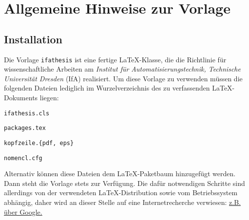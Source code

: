 
\chapter{Allgemeine Hinweise zur Vorlage}
\label{sec:AllgemeineHinweiseZurVorlage}

\section{Installation}
\label{sec:install}

Die Vorlage \verb-ifathesis- ist eine fertige \LaTeX-Klasse, die die Richtlinie für wissenschaftliche Arbeiten am \emph{Institut für Automatisierungstechnik, Technische Universität Dresden} (IfA) realisiert. Um diese Vorlage zu verwenden müssen die folgenden Dateien lediglich im Wurzelverzeichnis des zu verfassenden \LaTeX-Dokuments liegen:
\begin{compactitem}
  \item \verb-ifathesis.cls-
  \item \verb-packages.tex-
  \item \verb-kopfzeile.{pdf, eps}-
  \item \verb-nomencl.cfg-
\end{compactitem}
Alternativ können diese Dateien dem \LaTeX-Paketbaum hinzugefügt werden. Dann steht die Vorlage stets zur Verfügung. Die dafür notwendigen Schritte sind allerdings von der verwendeten \LaTeX-Distribution sowie vom Betriebssystem abhängig, daher wird an dieser Stelle auf eine Internetrecherche verwiesen: \href{http://www.google.de/search?sourceid=chrome&ie=UTF-8&q=latex+install+packages}{z.B. über Google.}

